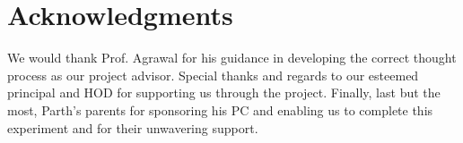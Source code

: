 


\thispagestyle{empty}
\pagestyle{empty}



\chapter*{Acknowledgments}
\vspace{0.2in}
\hspace{0.9cm} We would thank Prof. Agrawal for his
guidance in developing the correct thought process as our
project advisor. Special thanks and regards to our esteemed principal and HOD for supporting us through the project. Finally, last but the most, Parth's parents
for sponsoring his PC and enabling us to complete this
experiment and for their unwavering support.


